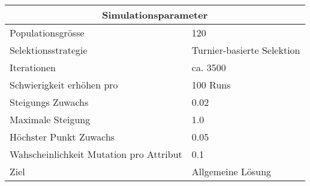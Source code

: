 
    \begin{tabular}{ | l | l | }
      \hline
      \multicolumn{2}{|c|}{Simulationsparameter} \\
      \hline
      Populationsgrösse & 120 \\ \hline
      Selektionsstrategie & Turnier-basierte Selektion \\ \hline
      Iterationen & ca. 3500 \\ \hline
      Schwierigkeit erhöhen pro & 100 Runs \\ \hline
      Steigungs Zuwachs & 0.02 \\ \hline
      Maximale Steigung & 1.0 \\ \hline
      Höchster Punkt Zuwachs & 0.05 \\ \hline
      Wahscheinlichkeit Mutation pro Attribut & 0.1 \\ \hline
      Ziel & Allgemeine Lösung \\ \hline
    \end{tabular}
